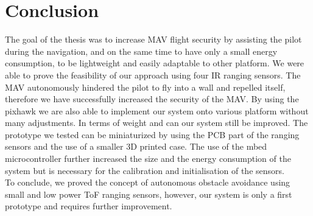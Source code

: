 \chapter{Conclusion}
The goal of the thesis was to increase MAV flight security by assisting the pilot during the navigation, and on the same time to have only a small energy consumption, to be lightweight and easily adaptable to other platform. We were able to prove the feasibility of our approach using four IR ranging sensors. The MAV autonomously hindered the pilot to fly into a wall and repelled itself, therefore we have successfully increased the security of the MAV. By using the pixhawk we are also able to implement our system onto various platform without many adjustments. In terms of weight and can our system still be improved. The prototype we tested can be miniaturized by using the PCB part of the ranging sensors and the use of a smaller 3D printed case. The use of the mbed microcontroller further increased the size and the energy consumption of the system but is necessary for the calibration and initialisation of the sensors.\\
To conclude, we proved the concept of autonomous obstacle avoidance using small and low power ToF ranging sensors, however, our system is only a first prototype and requires further improvement.\\
